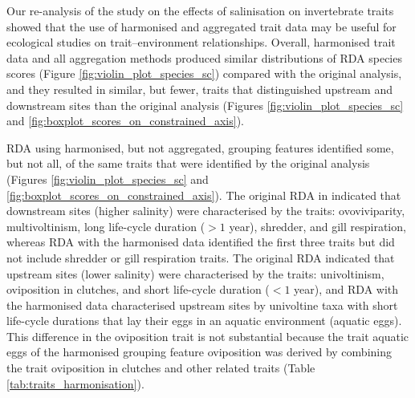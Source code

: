 \documentclass[12pt]{article}
\begin{document}
Our re-analysis of the \citet{szocs_effects_2014} study on the effects of salinisation on invertebrate traits showed that the use of harmonised and aggregated trait data may be useful for ecological studies on trait–environment relationships. Overall, harmonised trait data and all aggregation methods produced similar distributions of RDA species scores (Figure \ref{fig:violin_plot_species_sc}) compared with the original analysis, and they resulted in similar, but fewer, traits that distinguished upstream and downstream sites than the original analysis (Figures \ref{fig:violin_plot_species_sc} and \ref{fig:boxplot_scores_on_constrained_axis}).

RDA using harmonised, but not aggregated, grouping features identified some, but not all, of the same traits that were identified by the original analysis (Figures \ref{fig:violin_plot_species_sc} and \ref{fig:boxplot_scores_on_constrained_axis}). The original RDA in \citet{szocs_effects_2014} indicated that downstream sites (higher salinity) were characterised by the traits: ovoviviparity, multivoltinism, long life-cycle duration ($> 1$ year), shredder, and gill respiration, whereas RDA with the harmonised data identified the first three traits but did not include shredder or gill respiration traits. The original RDA indicated that upstream sites (lower salinity) were characterised by the traits: univoltinism, oviposition in clutches, and short life-cycle duration ($< 1$ year), and RDA with the harmonised data characterised upstream sites by univoltine taxa with short life-cycle durations that lay their eggs in an aquatic environment (aquatic eggs). This difference in the oviposition trait is not substantial because the trait aquatic eggs of the harmonised grouping feature oviposition was derived by combining the trait oviposition in clutches and other related traits (Table \ref{tab:traits_harmonisation}).
\end{document}
